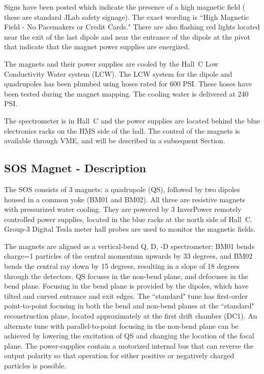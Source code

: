 Signs have been posted which indicate the presence of a high magnetic
field ( these are standard JLab safety signage). The exact wording is
``High Magnetic Field - No Pacemakers or Credit Cards." There
are also flashing red lights located near the exit of the last dipole
and near the entrance of the dipole at the pivot that indicate that the
magnet power supplies are energized.

The magnets and their power supplies
are cooled by the Hall~C Low Conductivity Water system (LCW).
The LCW system for the dipole and quadrupoles has been
plumbed using hoses rated for 600 PSI. These hoses have been tested during
the magnet mapping. The cooling water is delivered at 240 PSI.

The spectrometer is in Hall~C and the power supplies are located
behind the blue electronics racks on the HMS side of the hall.
The control of the magnets is available through VME, and will be
described in a subsequent Section.


\subsection{SOS Magnet - Description}

The SOS consists of 3 magnets: a quadrupole (QS), followed by two dipoles housed
in a common yoke (BM01 and BM02). All three are resistive magnets
with pressurized water cooling. They are powered by 3
InverPower remotely controlled power supplies, located in the blue racks at
the north side of Hall~C. Group-3 Digital Tesla meter hall probes
are used to monitor the magnetic fields.

The magnets are aligned as a vertical-bend Q, D, -D spectrometer: BM01 bends
charge=1 particles of the central momentum upwards by 33 degrees, and BM02 bends
the central ray down by 15 degrees, resulting in a slope of 18 degrees through
the detectors. QS focuses in the non-bend plane, and defocuses in the bend
plane. Focusing in the bend plane is provided by the dipoles, which have tilted
and curved entrance and exit edges. The ``standard" tune has first-order
point-to-point focusing in both the bend and non-bend planes at the ``standard"
reconstruction plane, located approximately at the first drift chamber (DC1).
An alternate tune with parallel-to-point focusing in the non-bend plane can be
achieved by lowering the excitation of QS and changing the location of the
focal plane. The power-supplies contain a motorized internal bus that can 
reverse
the output polarity so that operation for either positive or negatively charged
particles is possible.

